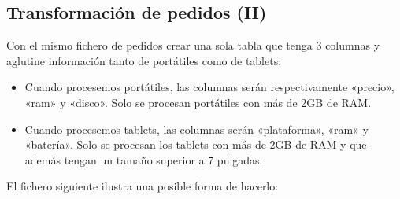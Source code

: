 \documentclass[letterpaper,10pt,spanish]{sphinxmanual}
\begin{document}
\begin{sphinxVerbatim}[commandchars=\\\{\}]
                                         
                                         
\end{sphinxVerbatim}


\subsection{Transformación de pedidos (II)}
\label{\detokenize{tema7:transformacion-de-pedidos-ii}}
Con el mismo fichero de pedidos crear una sola tabla que tenga 3 columnas y aglutine información tanto de portátiles como de tablets:
\begin{itemize}
\item {} 
Cuando procesemos portátiles, las columnas serán respectivamente «precio», «ram» y «disco». Solo se procesan portátiles con más de 2GB de RAM.

\item {} 
Cuando procesemos tablets, las columnas serán «plataforma», «ram» y «batería». Solo se procesan los tablets con más de 2GB de RAM y que además tengan un tamaño superior a 7 pulgadas.

\end{itemize}

El fichero siguiente ilustra una posible forma de hacerlo:
\end{document}
